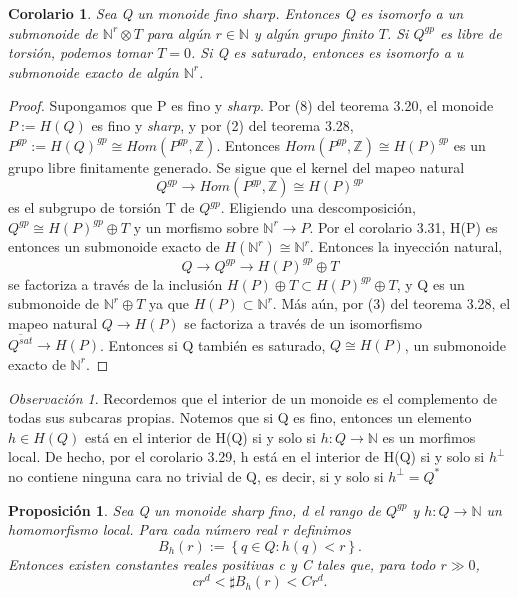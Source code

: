 \documentclass[12pt,spanish]{amsart}
\newcommand{\bb}[1]{\mathbb{#1}}
\newcommand{\set}[1]{\left\{{#1}\right\}}
\newtheorem{prop}[Theorem]{Proposición}
\newtheorem{cor}[Theorem]{Corolario}
\theoremstyle{definition}
\theoremstyle{remark}
\newtheorem{obs}[Theorem]{Observación}
\begin{document}
\begin{cor}
Sea Q un monoide fino \textit{sharp}. Entonces Q es isomorfo a un submonoide de $\bb{N}^{r} \otimes T$ para algún $r\in \bb{N}$ y algún grupo finito $T$. Si $Q^{gp}$ es libre de torsión, podemos tomar $T=0$. Si Q es saturado, entonces es isomorfo a u submonoide exacto de algún $\bb{N}^{r}$.  
\end{cor}

\begin{proof}
Supongamos que P es fino y \textit{sharp}. Por (8) del teorema 3.20, el monoide $P:=H(Q)$ es fino y \textit{sharp}, y por (2) del teorema 3.28, $P^{gp}:=H(Q)^{gp} \cong Hom(P^{gp},\bb{Z})$. Entonces $Hom(P^{gp},\bb{Z})\cong H(P)^{gp}$ es un grupo libre finitamente generado. Se sigue que el kernel del mapeo natural
$$Q^{gp} \to Hom(P^{gp},\bb{Z}) \cong H(P)^{gp}$$
es el subgrupo de torsión T de $Q^{gp}$. Eligiendo una descomposición,
$Q^{gp} \cong H(P)^{gp} \oplus T$
y un morfismo sobre $\bb{N}^{r} \to P$. Por el corolario 3.31, H(P) es entonces un submonoide exacto de $H(\bb{N}^{r}) \cong \bb{N}^{r}.$ Entonces la inyección natural,
$$Q \to Q^{gp} \to H(P)^{gp}\oplus T$$
se factoriza a través de la inclusión $H(P)\oplus T \subset H(P)^{gp}\oplus T$, y Q es un submonoide de $\bb{N}^{r}\oplus T$ ya que $H(P) \subset \bb{N}^{r}$. Más aún, por (3) del teorema 3.28, el mapeo natural $Q \to H(P)$ se factoriza a través de un isomorfismo $\overline{Q^{sat}} \to H(P)$. Entonces si Q también  es saturado, $Q\cong H(P)$, un submonoide exacto de $\bb{N}^{r}$. 
\end{proof}

\begin{obs}
Recordemos que el interior de un monoide es el complemento de todas sus subcaras propias. Notemos que si Q es fino, entonces un elemento $h\in H(Q)$ está en el interior de H(Q) si y solo si $h:Q \to \bb{N}$ es un morfimos local. De hecho, por el corolario 3.29, h está en el interior de H(Q) si y solo si $h^{\perp}$ no contiene ninguna cara no trivial de Q, es decir, si y solo si $h^{\perp}=Q^{\ast}$ 
\end{obs}


\begin{prop}
Sea Q un monoide \textit{sharp} fino, d el rango de $Q^{gp}$ y $h:Q \to \bb{N}$ un homomorfismo local. Para cada número real r definimos
$$B_{h}(r):=\set{q\in Q:h(q)<r}.$$
Entonces existen constantes reales positivas c y C tales que, para todo $r\gg 0$,
$$cr^{d}< \sharp B_{h}(r)<Cr^{d}.$$
\end{prop}
\end{document}
